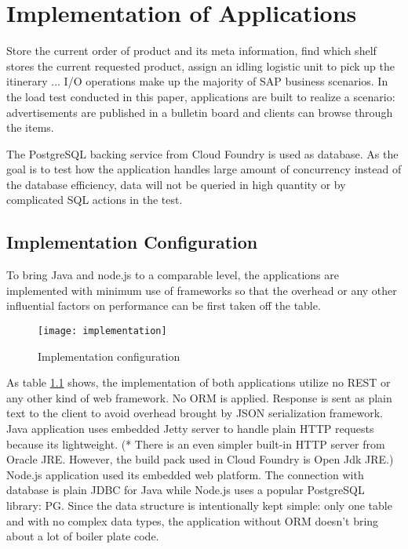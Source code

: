 \chapter{Implementation of Applications}
Store the current order of product and its meta information, find which shelf stores the current requested product, assign an idling logistic unit to pick up the itinerary ... I/O operations make up the majority of SAP business scenarios. 
 In the load test conducted in this paper, applications are built to realize a scenario: advertisements are published in a bulletin board and clients can browse through the items. 

The PostgreSQL backing service from Cloud Foundry is used as database. As the goal is to test how the application handles large amount of concurrency instead of the database efficiency, data will not be queried in high quantity or by complicated SQL actions in the test. 

\section{Implementation Configuration}
To bring Java and node.js to a comparable level, the applications are implemented with minimum use of frameworks so that the overhead or any other influential factors on performance can be first taken off the table.

 \begin{figure}[h]
 	\centering
 	\texttt{[image: implementation]}
 	\caption{Implementation configuration}
 	\label{implementation}
 \end{figure}

As table \ref{implementation} shows,  the implementation of both applications utilize no REST or any other kind of web framework. No ORM is applied. Response is sent as plain text to the client to avoid overhead brought by JSON serialization framework. \\
Java application uses embedded Jetty server to handle plain HTTP requests because its lightweight. (* There is an even simpler built-in HTTP server from Oracle JRE. However, the build pack used in Cloud Foundry is Open Jdk JRE.)  Node.js application used its embedded web platform. The connection with database is plain JDBC for Java while Node.js uses a popular PostgreSQL library: PG. Since the data structure is intentionally kept simple: only one table and with no complex data types, the application without ORM doesn't bring about a lot of boiler plate code.  \\

